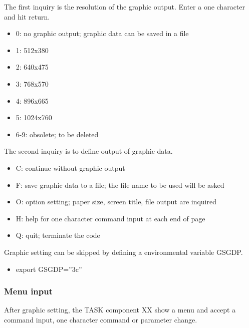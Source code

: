 \documentclass[11pt]{article}
\begin{document}
The first inquiry is the resolution of the graphic output. Enter a one
character and hit return.
\begin{itemize}
\item[]
0: no graphic output; graphic data can be saved in a file
\item[]
1: 512x380
\item[]
2: 640x475
\item[]
3: 768x570
\item[]
4: 896x665
\item[]
5: 1024x760
\item[]
6-9: obsolete; to be deleted
\end{itemize}

The second inquiry is to define output of graphic data.
\begin{itemize}
\item[]
C: continue without graphic output
\item[]
F: save graphic data to a file; the file name to be used will be asked
\item[]
O: option setting; paper size, screen title, file output are
inquired
\item[]
H: help for one character command input at each end of page
\item[]
Q: quit; terminate the code
\end{itemize}

Graphic setting can be skipped by defining a environmental variable
GSGDP.
\begin{itemize}
\item[]
export GSGDP=''3c''
\end{itemize}

\subsubsection{Menu input}

After graphic setting, the TASK component XX show a menu and accept
a command input, one character command or parameter change.
\end{document}
